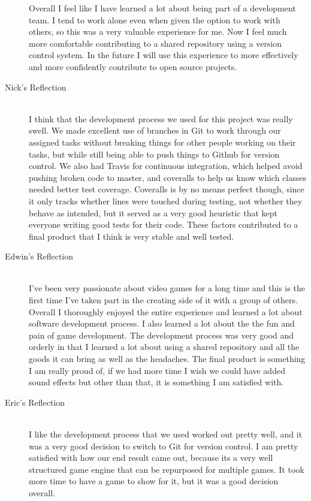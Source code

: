 \documentclass{article}
\begin{document}
\begin{description}
			Overall I feel like I have learned a lot about being part of a development 
			team. I tend to work alone even when given the option to work with others, 
			so this was a very valuable experience for me. Now I feel much more comfortable 
			contributing to a shared repository using a version control system. In the future 
			I will use this experience to more effectively and more confidently contribute to 
			open source projects.

			\item[Nick's Reflection] \hfill \\
			I think that the development process we used for this project was
			really swell. We made excellent use of branches in Git to work through
			our assigned tasks without breaking things for other people working on
			their tasks, but while still being able to push things to Github for
			version control. We also had Travis for continuous integration, which
			helped avoid pushing broken code to master, and coveralls to help us
			know which classes needed better test coverage. Coveralls is by no means
			perfect though, since it only tracks whether lines were touched during
			testing, not whether they behave as intended, but it served as a very
			good heuristic that kept everyone writing good tests for their code.
			These factors contributed to a final product that I think is very stable
			and well tested.

			\item[Edwin's Reflection] \hfill \\
			I've been very passionate about video games for a long time and this 
			is the first time I've taken part in the creating side of it with a group of
			others. Overall I thoroughly enjoyed the entire experience and learned a lot
			about software development process. I also learned a lot about the the fun
			and pain of game development. The development process was very good
			and orderly in that I learned a lot about using a shared repository and all the
			goods it can bring as well as the headaches. The final product is something
			I am really proud of, if we had more time I wish we could have added 
			sound effects but other than that, it is something I am satisfied with.

			\item[Eric's Reflection] \hfill \\
			I like the development process that we used worked out pretty well,
			and it was a very good decision to switch to Git for version control. I
			am pretty satisfied with how our end result came out, because its 
			a very well structured game engine that can be repurposed for multiple
			games. It took more time to have a game to show for it, but it was a 
			good decision overall.


\end{description}
\end{document}

